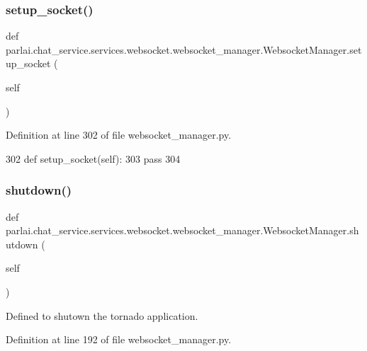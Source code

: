 \subsubsection{\texorpdfstring{setup\+\_\+socket()}{setup\_socket()}}
{\footnotesize\ttfamily def parlai.\+chat\+\_\+service.\+services.\+websocket.\+websocket\+\_\+manager.\+Websocket\+Manager.\+setup\+\_\+socket (\begin{DoxyParamCaption}\item[{}]{self }\end{DoxyParamCaption})}



Definition at line 302 of file websocket\+\_\+manager.\+py.


\begin{DoxyCode}
302     \textcolor{keyword}{def }setup\_socket(self):
303         \textcolor{keywordflow}{pass}
304 \end{DoxyCode}
\mbox{\label{classparlai_1_1chat__service_1_1services_1_1websocket_1_1websocket__manager_1_1WebsocketManager_a50a3ee9e3306b49c38eb1c480aa03734}} 
\subsubsection{\texorpdfstring{shutdown()}{shutdown()}}
{\footnotesize\ttfamily def parlai.\+chat\+\_\+service.\+services.\+websocket.\+websocket\+\_\+manager.\+Websocket\+Manager.\+shutdown (\begin{DoxyParamCaption}\item[{}]{self }\end{DoxyParamCaption})}

\begin{DoxyVerb}Defined to shutown the tornado application.
\end{DoxyVerb}
 

Definition at line 192 of file websocket\+\_\+manager.\+py.


